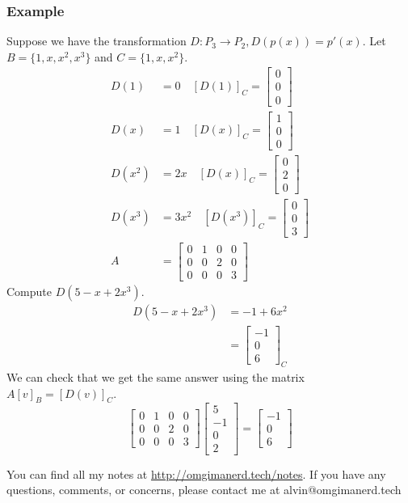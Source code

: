 \documentclass{math}
\begin{document}
\subsubsection*{Example}
Suppose we have the transformation \( D:P_3\to P_2, D(p(x)) = p'(x) \). Let
\( B = \{1,x,x^2,x^3\} \) and \( C = \{1,x,x^2\} \).
\begin{align*}
  D(1) &= 0 \quad [D(1)]_C = \begin{bmatrix}0 \\ 0 \\ 0\end{bmatrix} \\
  D(x) &= 1 \quad [D(x)]_C = \begin{bmatrix}1 \\ 0 \\ 0\end{bmatrix} \\
  D(x^2) &= 2x \quad [D(x)]_C = \begin{bmatrix}0 \\ 2 \\ 0\end{bmatrix} \\
  D(x^3) &= 3x^2 \quad [D(x^3)]_C = \begin{bmatrix}0 \\ 0 \\ 3\end{bmatrix} \\
  A &= \begin{bmatrix}
    0 & 1 & 0 & 0 \\
    0 & 0 & 2 & 0 \\
    0 & 0 & 0 & 3
  \end{bmatrix}
\end{align*}
Compute \( D(5-x+2x^3) \).
\begin{align*}
  D(5-x+2x^3) &= -1+6x^2 \\
  &= \begin{bmatrix}-1 \\ 0 \\ 6\end{bmatrix}_C
\end{align*}
We can check that we get the same answer using the matrix \( A[v]_B = [D(v)]_C
\).
\[ \begin{bmatrix}
  0 & 1 & 0 & 0 \\
  0 & 0 & 2 & 0 \\
  0 & 0 & 0 & 3
\end{bmatrix}\begin{bmatrix}5 \\ -1 \\ 0 \\ 2\end{bmatrix} = \begin{bmatrix}
  -1 \\ 0 \\ 6\end{bmatrix} \]

\begin{center}
  You can find all my notes at \url{http://omgimanerd.tech/notes}. If you have
  any questions, comments, or concerns, please contact me at
  alvin@omgimanerd.tech
\end{center}
\end{document}
